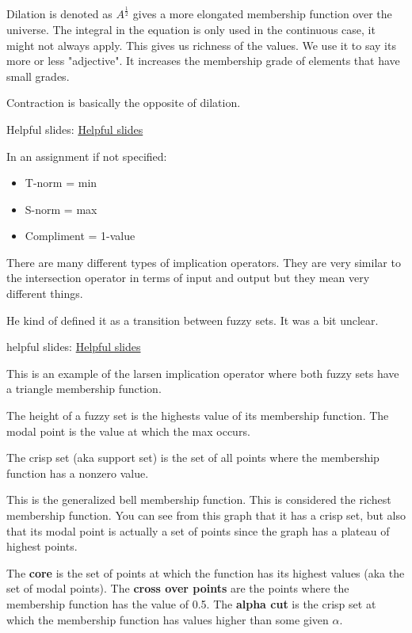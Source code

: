 \documentclass{article}
\begin{document}
Dilation is denoted as $A^{\frac{1}{2}}$  gives a more elongated membership function over the universe. The integral in the equation is only used in the continuous case, it might not always apply. This gives us richness of the values. We use it to say its more or less "adjective". It increases the membership grade of elements that have small grades.

Contraction is basically the opposite of dilation.

Helpful slides: \href{http://web.cecs.pdx.edu/~mperkows/CLASS_479/LECTURES479/FL001.PDF}{Helpful slides}



In an assignment if not specified:
\begin{itemize}
	\item T-norm = min
	\item S-norm = max
	\item Compliment = 1-value
\end{itemize}


There are many different types of implication operators. They are very similar to the intersection operator in terms of input and output but they mean very different things.

He kind of defined it as a transition between fuzzy sets. It was a bit unclear.


helpful slides: \href{http://www.intelligent-systems.info/classes/ee509/8.pdf}{Helpful slides}


This is an example of the larsen implication operator where both fuzzy sets have a triangle membership function.




The height of a fuzzy set is the highests value of its membership function. The modal point is the value at which the max occurs.



The crisp set (aka support set) is the set of all points where the membership function has a nonzero value.


This is the generalized bell membership function. This is considered the richest membership function. You can see from this graph that it has a crisp set, but also that its modal point is actually a set of points since the graph has a plateau of highest points.

The \textbf{core} is the set of points at which the function has its highest values (aka the set of modal points). The \textbf{cross over points} are the points where the membership function has the value of 0.5. The \textbf{alpha cut} is the crisp set at which the membership function has values higher than some given $\alpha$.
\end{document}
